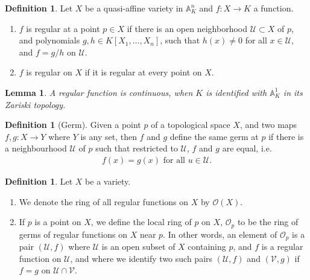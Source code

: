 \documentclass[11pt]{book}
\newtheorem{lemma}[theorem]{Lemma}
\theoremstyle{definition}
\newtheorem{definition}[theorem]{Definition}
\numberwithin{equation}{section}
\begin{document}
\begin{defbox}
    \begin{definition}
        Let \(X\) be a quasi-affine variety in \(\mathbb{A}^n_K\) and \(f: X \rightarrow K\) a function.
        \begin{enumerate}
            \item \(f\) is regular at a point \(p \in X\) if there is an open neighborhood \(\mathcal{U} \subset X\) of \(p\), and polynomials \(g, h \in K[X_1, \ldots, X_n]\), such that \(h(x) \neq 0\) for all \(x \in \mathcal{U}\), and \(f = g/h\) on \(\mathcal{U}\).
            \item \(f\) is regular on \(X\) if it is regular at every point on \(X\).
        \end{enumerate}
    \end{definition}
\end{defbox}
\begin{thmbox}
    \begin{lemma}
        A regular function is continuous, when \(K\) is identified with \(\mathbb{A}^1_K\) in its Zariski topology.
    \end{lemma}
\end{thmbox}
\begin{defbox}
    \begin{definition}[Germ]
        Given a point \(p\) of a topological space \(X\), and two maps \(f, g: X \rightarrow Y\) where \(Y\) is any set, then \(f\) and \(g\) define the same germ at \(p\) if there is a neighbourhood \(\mathcal{U}\) of \(p\) such that restricted to \(\mathcal{U}\), \(f\) and \(g\) are equal, i.e.
        \begin{align*}
            f(x) = g(x) \text{ for all } u \in \mathcal{U} \text{.}
        \end{align*}
    \end{definition}
\end{defbox}
\begin{defbox}
    \begin{definition}
        Let \(X\) be a variety.
        \begin{enumerate}
            \item We denote the ring of all regular functions on \(X\) by \(\mathcal{O}(X)\).
            \item If \(p\) is a point on \(X\), we define the local ring of \(p\) on \(X\), \(\mathcal{O}_p\) to be the ring of germs of regular functions on \(X\) near \(p\). In other words, an element of \(\mathcal{O}_p\) is a pair \((\mathcal{U}, f)\) where \(\mathcal{U}\) is an open subset of \(X\) containing \(p\), and \(f\) is a regular function on \(\mathcal{U}\), and where we identify two such pairs \((\mathcal{U}, f)\) and \((\mathcal{V}, g)\) if \(f = g\) on \(\mathcal{U} \cap \mathcal{V}\).
        \end{enumerate}
    \end{definition}
\end{defbox}
\end{document}
